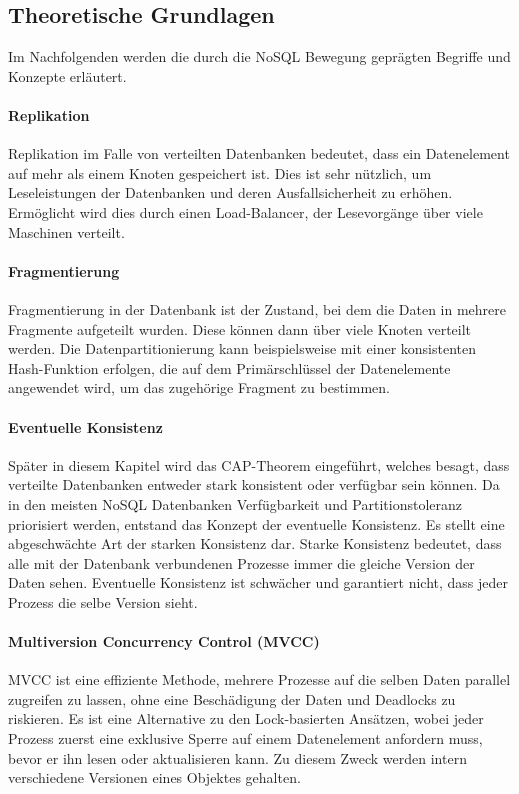 \subsection{Theoretische Grundlagen}
\label{ch:grundlagen:sec:NoSQL:NoSQLBasics}

Im Nachfolgenden werden die durch die NoSQL Bewegung geprägten Begriffe und Konzepte erläutert.

\paragraph{Replikation} Replikation im Falle von verteilten Datenbanken bedeutet, dass ein Datenelement auf mehr als einem Knoten gespeichert ist. Dies ist sehr nützlich, um Leseleistungen der Datenbanken und deren Ausfallsicherheit zu erhöhen. Ermöglicht wird dies durch einen Load-Balancer, der Lesevorgänge über viele Maschinen verteilt.

\paragraph{Fragmentierung} Fragmentierung in der Datenbank ist der Zustand, bei dem die Daten in mehrere Fragmente aufgeteilt wurden. Diese können dann über viele Knoten verteilt werden. Die Datenpartitionierung kann beispielsweise mit einer konsistenten Hash-Funktion erfolgen, die auf dem Primärschlüssel der Datenelemente angewendet wird, um das zugehörige Fragment zu bestimmen.

\paragraph{Eventuelle Konsistenz} Später in diesem Kapitel wird das CAP-Theorem eingeführt, welches besagt, dass verteilte Datenbanken entweder stark konsistent oder verfügbar sein können. Da in den meisten NoSQL Datenbanken Verfügbarkeit und Partitionstoleranz priorisiert werden, entstand das Konzept der eventuelle Konsistenz. Es stellt eine abgeschwächte Art der starken Konsistenz dar. Starke Konsistenz bedeutet, dass alle mit der Datenbank verbundenen Prozesse immer die gleiche Version der Daten sehen. Eventuelle Konsistenz ist schwächer und garantiert nicht, dass jeder Prozess die selbe Version sieht.

\paragraph{Multiversion Concurrency Control (MVCC)} MVCC ist eine effiziente Methode, mehrere Prozesse auf die selben Daten parallel zugreifen zu lassen, ohne eine Beschädigung der Daten und Deadlocks zu riskieren. Es ist eine Alternative zu den Lock-basierten Ansätzen, wobei jeder Prozess zuerst eine exklusive Sperre auf einem Datenelement anfordern muss, bevor er ihn lesen oder aktualisieren kann. Zu diesem Zweck werden intern verschiedene Versionen eines Objektes gehalten.

